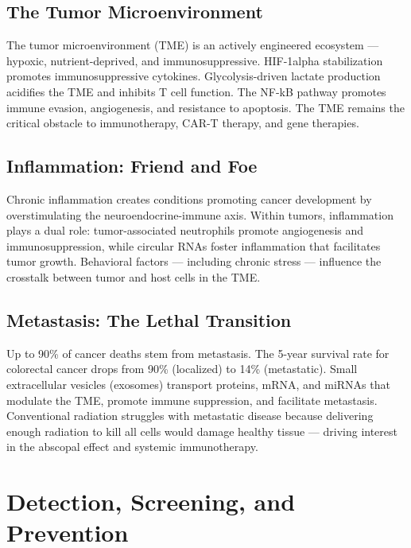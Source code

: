 \subsection{The Tumor
Microenvironment}\label{the-tumor-microenvironment}

The tumor microenvironment (TME) is an actively engineered ecosystem ---
hypoxic, nutrient-deprived, and immunosuppressive. HIF-1alpha
stabilization promotes immunosuppressive cytokines. Glycolysis-driven
lactate production acidifies the TME and inhibits T cell function. The
NF-kB pathway promotes immune evasion, angiogenesis, and resistance to
apoptosis. The TME remains the critical obstacle to immunotherapy, CAR-T
therapy, and gene therapies.

\subsection{Inflammation: Friend and
Foe}\label{inflammation-friend-and-foe}

Chronic inflammation creates conditions promoting cancer development by
overstimulating the neuroendocrine-immune axis. Within tumors,
inflammation plays a dual role: tumor-associated neutrophils promote
angiogenesis and immunosuppression, while circular RNAs foster
inflammation that facilitates tumor growth. Behavioral factors ---
including chronic stress --- influence the crosstalk between tumor and
host cells in the TME.

\subsection{Metastasis: The Lethal
Transition}\label{metastasis-the-lethal-transition}

Up to 90\% of cancer deaths stem from metastasis. The 5-year survival
rate for colorectal cancer drops from 90\% (localized) to 14\%
(metastatic). Small extracellular vesicles (exosomes) transport
proteins, mRNA, and miRNAs that modulate the TME, promote immune
suppression, and facilitate metastasis. Conventional radiation struggles
with metastatic disease because delivering enough radiation to kill all
cells would damage healthy tissue --- driving interest in the abscopal
effect and systemic immunotherapy.

\newpage

\section{Detection, Screening, and
Prevention}\label{detection-screening-and-prevention}

